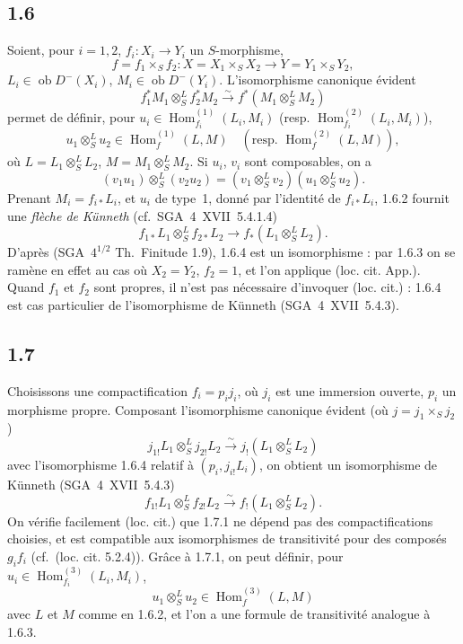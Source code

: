 \documentclass[11pt]{article}
\DeclareMathOperator{\Hom}{Hom}
\newcommand{\ob}{\operatorname{ob}}
\providecommand{\Hom}{\operatorname{Hom}}
\providecommand{\ob}{\operatorname{ob}}
\begin{document}
\subsection*{1.6}
Soient, pour $i=1,2$, $f_i:X_i\to Y_i$ un $S$-morphisme,
\[
f=f_1\times_S f_2:X=X_1\times_S X_2\to Y=Y_1\times_S Y_2,
\]
$L_i\in\ob D^{-}(X_i)$, $M_i\in\ob D^{-}(Y_i)$. L'isomorphisme canonique évident
\begin{equation}\tag{1.6.1}
f_1^{*}M_1\otimes^{L}_{S}f_2^{*}M_2\xrightarrow{\sim}f^{*}(M_1\otimes^{L}_{S}M_2)
\end{equation}
permet de définir, pour $u_i\in\Hom_{f_i}^{(1)}(L_i,M_i)$ (resp. $\Hom_{f_i}^{(2)}(L_i,M_i)$),
\begin{equation}\tag{1.6.2}
u_1\otimes^{L}_{S}u_2\in\Hom_{f}^{(1)}(L,M)\quad(\text{resp. }\Hom_f^{(2)}(L,M)),
\end{equation}
où $L=L_1\otimes^{L}_{S}L_2$, $M=M_1\otimes^{L}_{S}M_2$. Si $u_i$, $v_i$ sont composables, on a
\begin{equation}\tag{1.6.3}
(v_1u_1)\otimes^{L}_{S}(v_2u_2)=(v_1\otimes^{L}_{S}v_2)(u_1\otimes^{L}_{S}u_2).
\end{equation}
Prenant $M_i=f_{i*}L_i$, et $u_i$ de type~1, donné par l'identité de $f_{i*}L_i$, 1.6.2 fournit une \emph{flèche de Künneth} (cf.~SGA~4~XVII~5.4.1.4)
\begin{equation}\tag{1.6.4}
f_{1*}L_1\otimes^{L}_{S}f_{2*}L_2\longrightarrow f_{*}(L_1\otimes^{L}_{S}L_2).
\end{equation}
D'après (SGA~$4^{1/2}$ Th.~Finitude 1.9), 1.6.4 est un isomorphisme : par 1.6.3 on se ramène en effet au cas où $X_2=Y_2$, $f_2=1$, et l'on applique (loc. cit. App.). Quand $f_1$ et $f_2$ sont propres, il n'est pas nécessaire d'invoquer (loc. cit.) : 1.6.4 est cas particulier de l'isomorphisme de Künneth (SGA~4~XVII~5.4.3).

\subsection*{1.7}
Choisissons une compactification $f_i=p_i j_i$, où $j_i$ est une immersion ouverte, $p_i$ un morphisme propre. Composant l'isomorphisme canonique évident (où $j=j_1\times_S j_2$)
\[
j_{1!}L_1\otimes^{L}_{S}j_{2!}L_2\xrightarrow{\sim}j_{!}(L_1\otimes^{L}_{S}L_2)
\]
avec l'isomorphisme 1.6.4 relatif à $(p_i,j_{i!}L_i)$, on obtient un isomorphisme de Künneth (SGA~4~XVII~5.4.3)
\begin{equation}\tag{1.7.1}
f_{1!}L_1\otimes^{L}_{S}f_{2!}L_2\xrightarrow{\sim}f_{!}(L_1\otimes^{L}_{S}L_2).
\end{equation}
On vérifie facilement (loc. cit.) que 1.7.1 ne dépend pas des compactifications choisies, et est compatible aux isomorphismes de transitivité pour des composés $g_if_i$ (cf.~(loc. cit. 5.2.4)). Grâce à 1.7.1, on peut définir, pour $u_i\in\Hom_{f_i}^{(3)}(L_i,M_i)$,
\begin{equation}\tag{1.7.2}
u_1\otimes^{L}_{S}u_2\in\Hom_f^{(3)}(L,M)
\end{equation}
avec $L$ et $M$ comme en 1.6.2, et l'on a une formule de transitivité analogue à 1.6.3.
\end{document}
